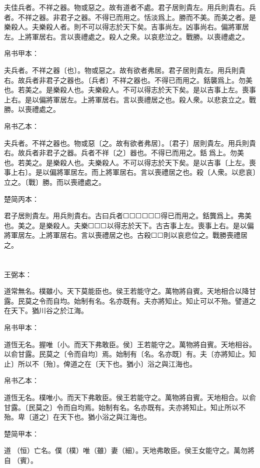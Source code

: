 \documentclass[a5paper]{ctexbook}
\begin{document}
    夫佳兵者。不祥之器。物或惡之。故有道者不處。君子居則貴左。用兵則貴右。兵者。不祥之器。非君子之器。不得已而用之。恬淡爲上。勝而不美。而美之者。是樂殺人。夫樂殺人者。則不可以得志於天下矣。吉事尚左。凶事尚右。偏將軍居左。上將軍居右。言以喪禮處之。殺人之衆。以哀悲泣之。戰勝。以喪禮處之。

    
    帛书甲本：

    夫兵者。不祥之器〔也〕。物或惡之。故有欲者弗居。君子居則貴左。用兵則貴右。故兵者非君子之器也。〔兵者〕不祥之器也。不得已而用之。銛襲爲上。勿美也。若美之。是樂殺人也。夫樂殺人。不可以得志於天下矣。是以吉事上左。喪事上右。是以偏將軍居左。上將軍居右。言以喪禮居之也。殺人衆。以悲哀立之。戰勝。以喪禮處之。

    帛书乙本：

    夫兵者。不祥之器也。物或惡〔之。故有欲者弗居〕。〔君子〕居則貴左。用兵則貴右。故兵者非君子之器。兵者不祥〔之〕器也。不得已而用之。銛𢤱爲上。勿美也。若美之。是樂殺人也。夫樂殺人。不可以得志於天下矣。是以吉事〔上左。喪事上右〕。是以偏將軍居左。而上將軍居右。言以喪禮居之也。殺〔人衆。以悲哀〕立之。〔戰〕勝。而以喪禮處之。

    楚简丙本：

    君子居則貴左。用兵則貴右。古曰兵者☐☐☐☐☐☐得已而用之。銛龔爲上。弗美也。美之。是樂殺人。夫樂☐☐☐以得志於天下。古吉事上左。喪事上右。是以偏將軍居左。上將軍居右。言以喪禮居之也。古殺☐☐則以哀悲位之。戰勝喪禮居之。

    \chapter{}
    王弼本：

    道常無名。樸雖小。天下莫能臣也。侯王若能守之。萬物將自賓。天地相合以降甘露。民莫之令而自均。始制有名。名亦既有。夫亦將知止。知止可以不殆。譬道之在天下。猶川谷之於江海。

    
    帛书甲本：

    道恆无名。握唯〔小。而天下弗敢臣。侯〕王若能守之。萬物將自賓。天地相谷。以俞甘露。民莫之〔令而自均〕焉。始制有〔名。名亦既〕有。夫〔亦將知止。知止〕所以不〔殆〕。俾道之在〔天下也。猶小〕浴之與江海也。

    帛书乙本：

    道恆无名。樸唯小。而天下弗敢臣。侯王若能守之。萬物將自賓。天地相合。以俞甘露。〔民莫之〕令而自均焉。始制有名。名亦既有。夫亦將知止。知止所以不殆。卑〔道之〕在天下也。猶小浴之與江海也。

    楚简甲本：

    道𠄨（恒）亡名。僕（樸）唯（雖）妻（細）。天地弗敢臣。侯王女能守之。萬勿將自󵦐（賓）。
\end{document}
